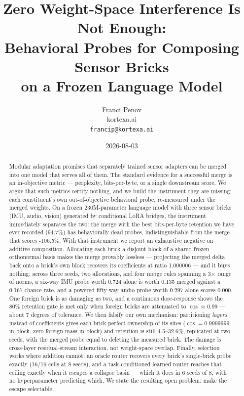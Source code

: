 \documentclass[11pt]{article}
\title{Zero Weight-Space Interference Is Not Enough:\\Behavioral Probes for Composing Sensor Bricks\\on a Frozen Language Model}
\author{Franci Penov \\ kortexa.ai \\ \texttt{francip@kortexa.ai}}
\date{2026-08-03}
\begin{document}
\maketitle

\begin{abstract}
Modular adaptation promises that separately trained sensor adapters can be merged into one model that serves all of them. The standard evidence for a successful merge is an in-objective metric --- perplexity, bits-per-byte, or a single downstream score. We argue that such metrics certify nothing, and we build the instrument they are missing: each constituent's own out-of-objective behavioral probe, re-measured under the merged weights. On a frozen 230M-parameter language model with three sensor bricks (IMU, audio, vision) generated by conditional LoRA bridges, the instrument immediately separates the two: the merge with the best bits-per-byte retention we have ever recorded (94.7\%) has behaviorally dead probes, indistinguishable from the merge that scores -106.5\%. With that instrument we report an exhaustive negative on additive composition. Allocating each brick a disjoint block of a shared frozen orthonormal basis makes the merge provably lossless --- projecting the merged delta back onto a brick's own block recovers its coefficients at ratio 1.000006 --- and it buys nothing: across three seeds, two allocations, and four merge rules spanning a 3$\times$ range of norms, a six-way IMU probe worth 0.724 alone is worth 0.135 merged against a 0.167 chance rate, and a powered fifty-way audio probe worth 0.297 alone scores 0.000. One foreign brick is as damaging as two, and a continuous dose-response shows the 80\% retention gate is met only when foreign bricks are attenuated to $\cos \approx 0.99$ --- about 7 degrees of tolerance. We then falsify our own mechanism: partitioning \emph{layers} instead of coefficients gives each brick perfect ownership of its sites ($\cos = 0.9999999$ in-block, zero foreign mass in-block) and retention is still 4.5--32.6\%, replicated at two seeds, with the merged probe equal to deleting the measured brick. The damage is cross-layer residual-stream interaction, not weight-space overlap. Finally, selection works where addition cannot: an oracle router recovers every brick's single-brick probe exactly (16/16 cells at 8 seeds), and a task-conditioned learned router reaches that ceiling exactly when it escapes a collapse basin --- which it does in 6 seeds of 8, with no hyperparameter predicting which. We state the resulting open problem: make the escape selectable.
\end{abstract}
\end{document}
